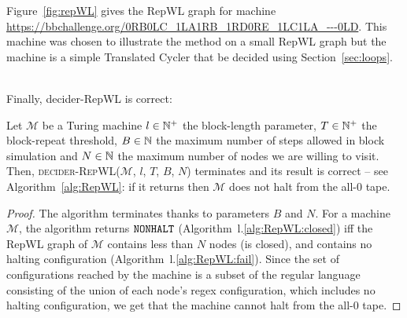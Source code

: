 \begin{example}
    Figure~\ref{fig:repWL} gives the RepWL graph for machine \url{https://bbchallenge.org/0RB0LC_1LA1RB_1RD0RE_1LC1LA_---0LD}. This machine was chosen to illustrate the method on a small RepWL graph but the machine is a simple Translated Cycler that be decided using Section~\ref{sec:loops}.
\end{example}

\ \\
Finally, {\sc decider-RepWL} is correct:

\begin{theorem}\label{th:repwl}
    Let $\mathcal{M}$ be a Turing machine $l\in \mathbb{N}^+$ the block-length parameter, $T \in \mathbb{N}^+$ the block-repeat threshold, $B \in \mathbb{N}$ the maximum number of steps allowed in block simulation and $N \in \mathbb{N}$ the maximum number of nodes we are willing to visit. Then, \textsc{decider-RepWL}($\mathcal{M}$, $l$, $T$, $B$, $N$) terminates and its result is correct -- see Algorithm~\ref{alg:RepWL}: if it returns \NONHALT then $\mathcal{M}$ does not halt from the all-$0$ tape.
\end{theorem}
\begin{proof}
    The algorithm terminates thanks to parameters $B$ and $N$. For a machine $\mathcal{M}$, the algorithm returns $\texttt{NONHALT}$ (Algorithm~l.\ref{alg:RepWL:closed}) iff the RepWL graph of $\mathcal{M}$ contains less than $N$ nodes (\ie is closed), and contains no halting configuration (Algorithm~l.\ref{alg:RepWL:fail}). Since the set of configurations reached by the machine is a subset of the regular language consisting of the union of each node's regex configuration, which includes no halting configuration, we get that the machine cannot halt from the all-0 tape.
\end{proof}


